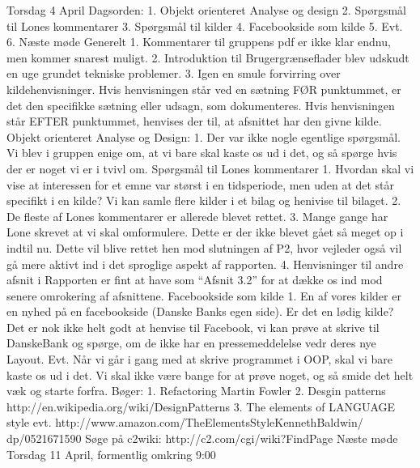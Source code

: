 Torsdag 4 April
Dagsorden:
1. Objekt orienteret Analyse og design
2. Spørgsmål til Lones kommentarer
3. Spørgsmål til kilder
4. Facebookside som kilde
5. Evt.
6. Næste møde
Generelt
1. Kommentarer til gruppens pdf er ikke klar endnu, men kommer snarest muligt.
2. Introduktion til Brugergrænseflader blev udskudt en uge grundet tekniske problemer.
3. Igen en smule forvirring over kildehenvisninger. Hvis henvisningen står ved en sætning
FØR punktummet, er det den specifikke sætning eller udsagn, som dokumenteres. Hvis
henvisningen står EFTER punktummet, henvises der til, at afsnittet har den givne kilde.
Objekt orienteret Analyse og Design:
1. Der var ikke nogle egentlige spørgsmål. Vi blev i gruppen enige om, at vi bare skal kaste
os ud i det, og så spørge hvis der er noget vi er i tvivl om.
Spørgsmål til Lones kommentarer
1. Hvordan skal vi vise at interessen for et emne var størst i en tidsperiode, men uden at det
står specifikt i en kilde? Vi kan samle flere kilder i et bilag og henivise til bilaget.
2. De fleste af Lones kommentarer er allerede blevet rettet.
3. Mange gange har Lone skrevet at vi skal omformulere. Dette er der ikke blevet gået så
meget op i indtil nu. Dette vil blive rettet hen mod slutningen af P2, hvor vejleder også vil
gå mere aktivt ind i det sproglige aspekt af rapporten.
4. Henvisninger til andre afsnit i Rapporten er fint at have som “Afsnit 3.2” for at dække os
ind mod senere omrokering af afsnittene.
Facebookside som kilde
1. En af vores kilder er en nyhed på en facebookside
(Danske Banks egen side). Er det en
lødig kilde? Det er nok ikke helt godt at henvise til Facebook, vi kan prøve at skrive til
DanskeBank og spørge, om de ikke har en pressemeddelelse vedr deres nye Layout.
Evt.
Når vi går i gang med at skrive programmet i OOP, skal vi bare kaste os ud i det. Vi skal ikke
være bange for at prøve noget, og så smide det helt væk og starte forfra.
Bøger:
1. Refactoring Martin
Fowler
2. Desgin patterns http://en.wikipedia.org/wiki/DesignPatterns
3. The elements of LANGUAGE style evt. http://www.amazon.com/TheElementsStyleKennethBaldwin/
dp/0521671590
Søge på c2wiki:
http://c2.com/cgi/wiki?FindPage
Næste møde
Torsdag 11 April, formentlig omkring 9:00
